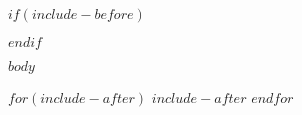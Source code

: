 \documentclass[$for(classoption)$$classoption$$sep$,$endfor$]{style/trbunofficial_bdit}
\begin{document}
$if(include-before)$
\maketitle
$endif$

$body$

$for(include-after)$
$include-after$
$endfor$


\begingroup
\raggedright

\endgroup
\end{document}
